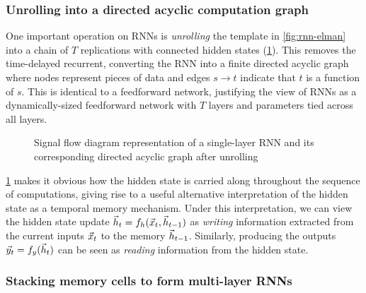 \subsubsection{Unrolling into a directed acyclic computation graph}

One important operation on RNNs is \emph{unrolling} the template in
\cref{fig:rnn-elman} into a chain of $T$ replications with connected hidden
states (\cref{fig:rnn-single-unrolled}). This removes the time-delayed
recurrent, converting the RNN into a finite directed acyclic graph where nodes
represent pieces of data and edges $s \to t$ indicate that $t$ is a function of
$s$. This is identical to a feedforward network, justifying the view of RNNs as
a dynamically-sized feedforward network with $T$ layers and parameters tied
across all layers.


\begin{figure}[tb]
  \centering
  \resizebox{4.5in}{!}{}
  \caption{Signal flow diagram representation of a single-layer RNN and its
  corresponding directed acyclic graph after unrolling}
  \label{fig:rnn-single-unrolled}
\end{figure}

\cref{fig:rnn-single-unrolled} makes it obvious how the hidden state is
carried along throughout the sequence of computations, giving rise to a useful
alternative interpretation of the hidden state as a temporal memory mechanism.
Under this interpretation, we can view the hidden state update $\vec{h}_t = f_h
(\vec{x}_t, \vec{h}_{t-1})$ as \emph{writing} information extracted from the
current inputs $\vec{x}_t$ to the memory $\vec{h}_{t-1}$. Similarly, producing
the outputs $\vec{y}_t = f_y (\vec{h}_t)$ can be seen as \emph{reading}
information from the hidden state.


\subsubsection{Stacking memory cells to form multi-layer RNNs}

